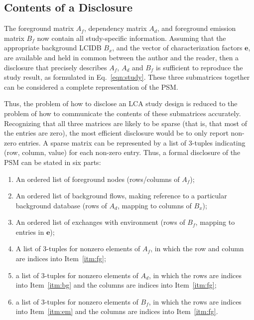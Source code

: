 \subsection{Contents of a Disclosure}

The foreground matrix $A_f$, dependency matrix $A_d$, and foreground emission matrix $B_f$ now contain all study-specific information.  Assuming that the appropriate background LCIDB $B_x$, and the vector of characterization factors $\mathbf{e}$, are available and held in common between the author and the reader, then a disclosure that precisely describes $A_f$, $A_d$ and $B_f$ is sufficient to reproduce the study result, as formulated in Eq.~\ref{eqn:study}.  These three submatrices together can be considered a complete representation of the PSM.

Thus, the problem of how to disclose an LCA study design is reduced to the problem of how to communicate the contents of these submatrices accurately.  Recognizing that all three matrices are likely to be sparse (that is, that most of the entries are zero), the most efficient disclosure would be to only report non-zero entries.  A sparse matrix can be represented by a list of 3-tuples indicating (row, column, value) for each non-zero entry.  Thus, a formal disclosure of the PSM can be stated in six parts:
\begin{enumerate}[label={\em d-\roman*}., ref={\em d-\roman*}]
\item\label{itm:fg} An ordered list of foreground nodes (rows/columns of $A_f$);
\item\label{itm:bg} An ordered list of background flows, making reference to a particular background database (rows of $A_d$, mapping to columns of $B_x$);
\item\label{itm:em} An ordered list of exchanges with environment (rows of $B_f$, mapping to entries in $\mathbf{e}$);
\item\label{itm:af} A list of 3-tuples for nonzero elements of $A_f$, in which the row and column are indices into Item~\ref{itm:fg};
\item\label{itm:ad} a list of 3-tuples for nonzero elements of $A_d$, in which the rows are indices into Item~\ref{itm:bg} and the columns are indices into Item~\ref{itm:fg};
\item\label{itm:bf} a list of 3-tuples for nonzero elements of $B_f$, in which the rows are indices into Item~\ref{itm:em} and the columns are indices into Item~\ref{itm:fg}.
\end{enumerate}

